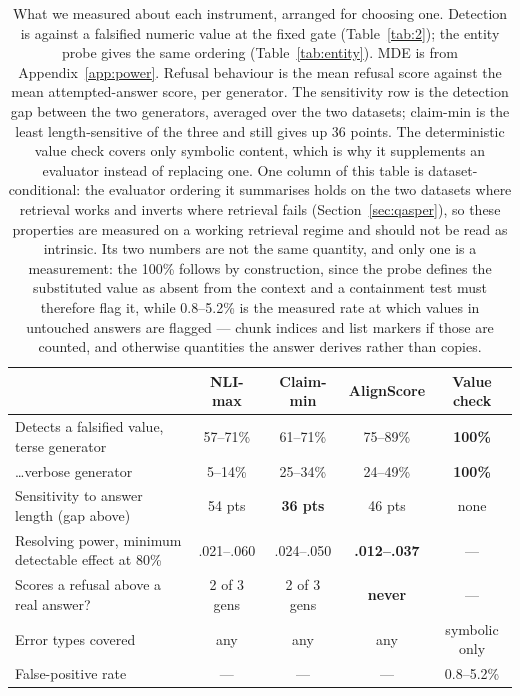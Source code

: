\documentclass[11pt]{article}
\begin{document}
\begin{table}[t]
\centering\small
\begin{tabular}{lcccc}
\toprule
 & \textbf{NLI-max} & \textbf{Claim-min} & \textbf{AlignScore} & \textbf{Value check} \\
\midrule
Detects a falsified value, terse generator & 57--71\% & 61--71\% & 75--89\% & \textbf{100\%} \\
\quad \dots verbose generator & 5--14\% & 25--34\% & 24--49\% & \textbf{100\%} \\
Sensitivity to answer length (gap above) & 54 pts & \textbf{36 pts} & 46 pts & none \\
Resolving power, minimum detectable effect at 80\% & .021--.060 & .024--.050 & \textbf{.012--.037} & --- \\
Scores a refusal above a real answer? & 2 of 3 gens & 2 of 3 gens & \textbf{never} & --- \\
Error types covered & any & any & any & symbolic only \\
False-positive rate & --- & --- & --- & 0.8--5.2\% \\
\bottomrule
\end{tabular}
\caption{What we measured about each instrument, arranged for choosing one. Detection is against a falsified numeric value at the fixed gate (Table~\ref{tab:2}); the entity probe gives the same ordering (Table~\ref{tab:entity}). MDE is from Appendix~\ref{app:power}. Refusal behaviour is the mean refusal score against the mean attempted-answer score, per generator. The sensitivity row is the detection gap between the two generators, averaged over the two datasets; claim-min is the least length-sensitive of the three and still gives up 36 points. The deterministic value check covers only symbolic content, which is why it supplements an evaluator instead of replacing one. One column of this table is dataset-conditional: the evaluator ordering it summarises holds on the two datasets where retrieval works and inverts where retrieval fails (Section~\ref{sec:qasper}), so these properties are measured on a working retrieval regime and should not be read as intrinsic. Its two numbers are not the same quantity, and only one is a measurement: the 100\% follows by construction, since the probe defines the substituted value as absent from the context and a containment test must therefore flag it, while 0.8--5.2\% is the measured rate at which values in untouched answers are flagged --- chunk indices and list markers if those are counted, and otherwise quantities the answer derives rather than copies.}
\label{tab:choose}
\end{table}
\end{document}
